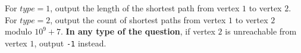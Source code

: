 For $type = 1$, output the length of the shortest path from vertex $1$ to vertex $2$.
For $type = 2$, output the count of shortest paths from vertex $1$ to vertex $2$ modulo $10 ^ 9 + 7$.
\textbf{In any type of the question}, if vertex $2$ is unreachable from vertex $1$, output \texttt{-1} instead.